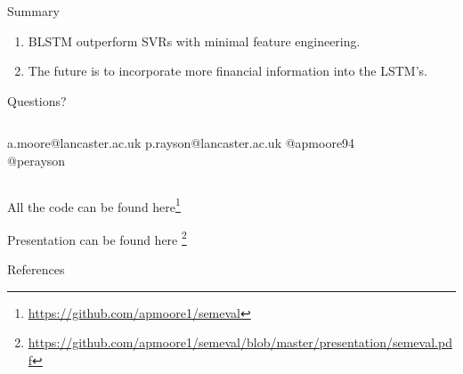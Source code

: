 \documentclass[10pt]{beamer}
\begin{document}
\begin{frame}[fragile]{Summary}
\begin{enumerate}
\item BLSTM outperform SVRs with minimal feature engineering.
\item The future is to incorporate more financial information into the LSTM's.
\end{enumerate}

\end{frame}

\begin{frame}[plain]
\begin{center}
\begin{center}
\huge Questions?
\end{center}
\begin{center}
\begin{columns}[T,onlytextwidth]
\centering
\normalsize a.moore@lancaster.ac.uk
\normalsize p.rayson@lancaster.ac.uk
\centering
\normalsize @apmoore94\\
\normalsize @perayson
\end{columns}
\end{center}
\end{center}

\begin{center}
\begin{center}
\small All the code can be found here\footnote{\url{https://github.com/apmoore1/semeval}}
\end{center}
\begin{center}
\small Presentation can be found here \footnote{\url{https://github.com/apmoore1/semeval/blob/master/presentation/semeval.pdf}}
\end{center}
\end{center}

\end{frame}




\begin{frame}[allowframebreaks]{References}
  
  

\end{frame}
\end{document}
